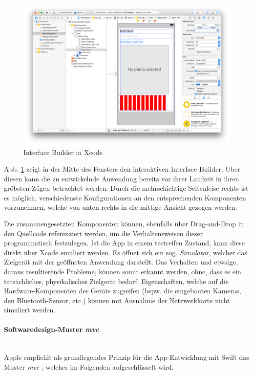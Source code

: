 \begin{figure}[h!]
	\centering
	\includegraphics[width=\linewidth]{img/fig/2-3-1-interface-builder}
	\caption{Interface Builder in Xcode \cite{AppleIB}}
	\label{fig:xcode-ib}
\end{figure}

Abb. \ref{fig:xcode-ib} zeigt in der Mitte des Fensters den interaktiven Interface Builder. Über diesen kann die zu entwickelnde Anwendung bereits vor ihrer Laufzeit in ihren gröbsten Zügen betrachtet werden. Durch die mehrschichtige Seitenleise rechts ist es möglich, verschiedenste Konfigurationen an den entsprechenden Komponenten vorzunehmen, welche von unten rechts in die mittige Ansicht gezogen werden.

Die zusammengesetzten Komponenten können, ebenfalls über Drag-and-Drop in den Quellcode referenziert werden, um die Verhaltensweisen dieser programmatisch festzulegen. Ist die App in einem testreifen Zustand, kann diese direkt über Xcode emuliert werden. Es öffnet sich ein sog. \textit{Simulator}, welcher das Zielgerät mit der geöffneten Anwendung darstellt. Das Verhalten und etwaige, daraus resultierende Probleme, können somit erkannt werden, ohne, dass es ein tatsächliches, physikalisches Zielgerät bedarf. Eigenschaften, welche auf die Hardware-Komponenten des Geräts zugreifen (bspw. die eingebauten Kameras, den Bluetooth-Sensor, etc.) können mit Ausnahme der Netzwerkkarte nicht simuliert werden.

\paragraph{Softwaredesign-Muster \textit{\acf{mvc}}}\mbox{}\\ 
Apple empfiehlt als grundlegendes Prinzip für die App-Entwicklung mit Swift das Muster \textit{\ac{mvc}} \cite{AppleMVC}, welches im Folgenden aufgeschlüsselt wird.

